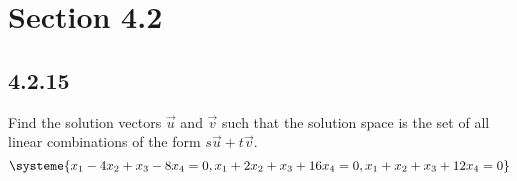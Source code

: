 \documentclass{article}
\begin{document}
\newcommand{\hr}{\par\noindent\rule{\textwidth}{0.4pt}}

\newcommand{\bc}[1]{
	\begin{equation*}
		\begin{boxed}
			{#1}
		\end{boxed}
	\end{equation*}
}

\newcommand{\cond}[2]{
	\ifmmode
		{#1} \quad {#2}
	\else
		$$ {#1} \quad {#2} $$
	\fi
}

\newcommand{\matr}[1]{\mathbf{#1}}

\tableofcontents

\section{Section 4.2}

\subsection{4.2.15}

Find the solution vectors $ \vec{u} $ and $ \vec{v} $ such that the solution space is the set of all linear combinations of the form $ s\vec{u} + t\vec{v} $.
\begin{equation*}
	\systeme{
		x_1 - 4x_2 + x_3 - 8x_4 = 0,
		x_1 + 2x_2 + x_3 + 16x_4 = 0,
		x_1 + x_2 + x_3 + 12x_4 = 0
	}
\end{equation*}
\end{document}
